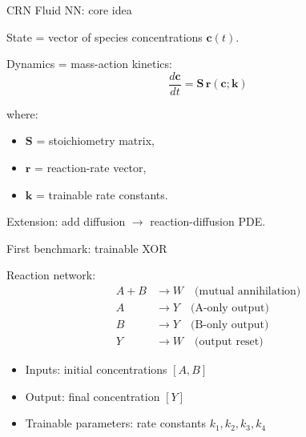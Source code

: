 \documentclass[aspectratio=169,11pt]{beamer}
\begin{document}
\begin{frame}{CRN Fluid NN: core idea}

State = vector of species concentrations $\mathbf{c}(t)$.

\vspace{0.3cm}
Dynamics = mass-action kinetics:
\begin{equation*}
    \frac{d\mathbf{c}}{dt} = \mathbf{S}\,\mathbf{r}(\mathbf{c}; \mathbf{k})
\end{equation*}

\vspace{0.2cm}
where:
\begin{itemize}
    \item $\mathbf{S}$ = stoichiometry matrix,
    \item $\mathbf{r}$ = reaction-rate vector,
    \item $\mathbf{k}$ = trainable rate constants.
\end{itemize}

\vspace{0.3cm}
Extension: add diffusion $\rightarrow$ reaction-diffusion PDE.

\end{frame}

\begin{frame}{First benchmark: trainable XOR}

Reaction network:
\begin{align*}
    A + B &\rightarrow W \quad \text{(mutual annihilation)} \\
    A &\rightarrow Y \quad \text{(A-only output)} \\
    B &\rightarrow Y \quad \text{(B-only output)} \\
    Y &\rightarrow W \quad \text{(output reset)}
\end{align*}

\vspace{0.3cm}
\begin{itemize}
    \item Inputs: initial concentrations $[A, B]$
    \item Output: final concentration $[Y]$
    \item Trainable parameters: rate constants $k_1, k_2, k_3, k_4$
\end{itemize}

\end{frame}
\end{document}
